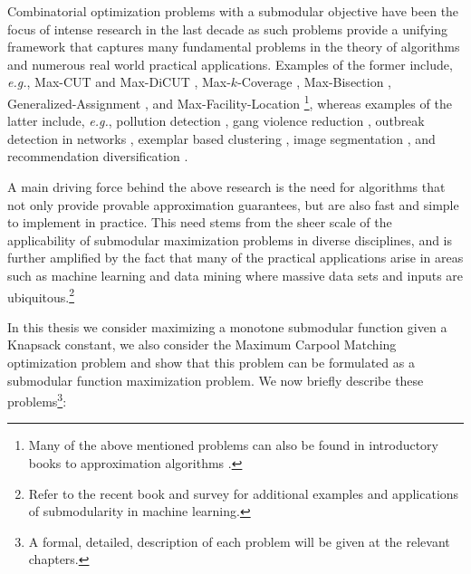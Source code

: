 Combinatorial optimization problems with a submodular objective have been the focus of intense research in the last decade as such problems provide a unifying framework that captures many fundamental problems in the theory of algorithms and numerous real world practical applications.
Examples of the former include, {\em e.g.}, Max-CUT and Max-DiCUT \cite{FG95,GW95,HZ01,H01,K72,KKMO07,LLZ02,TSSW00}, Max-$k$-Coverage \cite{F98,SW11,V01}, Max-Bisection \cite{ABG13,FJ97,HZ02,Y01}, Generalized-Assignment \cite{CK05,CKR06,FGMS06,FV06}, and Max-Facility-Location \cite{AS99,CFN77a,CFN77b}\footnote{Many of the above mentioned problems can also be found in introductory books to approximation algorithms \cite{SW11,V01}.}, whereas examples of the latter include, {\em e.g.}, pollution detection \cite{KLGVF08}, gang violence reduction \cite{SSPB14}, outbreak detection in networks \cite{LKGFFVG07}, exemplar based clustering \cite{GK10}, image segmentation \cite{KXFK11}, and recommendation diversification \cite{YG11}.

A main driving force behind the above research is the need for algorithms that not only provide provable approximation guarantees, but are also fast and  simple to implement in practice.
This need stems from the sheer scale of the applicability of submodular maximization problems in diverse disciplines, and is further amplified by the fact that many of the practical applications arise in areas such as machine learning and data mining where massive data sets and inputs are ubiquitous.\footnote{Refer to the recent book \cite{B13} and survey \cite{KG14} for additional examples and applications of submodularity in machine learning.}

In this thesis we consider maximizing a monotone submodular function given a Knapsack constant, we also consider the Maximum Carpool Matching optimization problem and show that this problem can be formulated as a submodular function maximization problem.
We now briefly describe these problems\footnote{A formal, detailed, description of each problem will be given at the relevant chapters.}:

